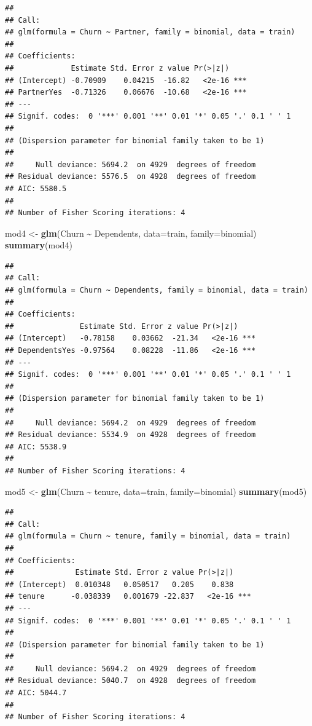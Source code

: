 \documentclass[
  twoside]{article}
\newenvironment{Shaded}{\begin{snugshade}}{\end{snugshade}}
\newcommand{\AttributeTok}[1]{\textcolor[rgb]{0.13,0.29,0.53}{#1}}
\newcommand{\FunctionTok}[1]{\textcolor[rgb]{0.13,0.29,0.53}{\textbf{#1}}}
\newcommand{\NormalTok}[1]{#1}
\newcommand{\OtherTok}[1]{\textcolor[rgb]{0.56,0.35,0.01}{#1}}
\newcommand{\SpecialCharTok}[1]{\textcolor[rgb]{0.81,0.36,0.00}{\textbf{#1}}}
\begin{document}
\begin{verbatim}
## 
## Call:
## glm(formula = Churn ~ Partner, family = binomial, data = train)
## 
## Coefficients:
##             Estimate Std. Error z value Pr(>|z|)    
## (Intercept) -0.70909    0.04215  -16.82   <2e-16 ***
## PartnerYes  -0.71326    0.06676  -10.68   <2e-16 ***
## ---
## Signif. codes:  0 '***' 0.001 '**' 0.01 '*' 0.05 '.' 0.1 ' ' 1
## 
## (Dispersion parameter for binomial family taken to be 1)
## 
##     Null deviance: 5694.2  on 4929  degrees of freedom
## Residual deviance: 5576.5  on 4928  degrees of freedom
## AIC: 5580.5
## 
## Number of Fisher Scoring iterations: 4
\end{verbatim}

\begin{Shaded}
\begin{Highlighting}[]
\NormalTok{mod4 }\OtherTok{\textless{}{-}} \FunctionTok{glm}\NormalTok{(Churn }\SpecialCharTok{\textasciitilde{}}\NormalTok{ Dependents, }\AttributeTok{data=}\NormalTok{train, }\AttributeTok{family=}\NormalTok{binomial)}
\FunctionTok{summary}\NormalTok{(mod4)}
\end{Highlighting}
\end{Shaded}

\begin{verbatim}
## 
## Call:
## glm(formula = Churn ~ Dependents, family = binomial, data = train)
## 
## Coefficients:
##               Estimate Std. Error z value Pr(>|z|)    
## (Intercept)   -0.78158    0.03662  -21.34   <2e-16 ***
## DependentsYes -0.97564    0.08228  -11.86   <2e-16 ***
## ---
## Signif. codes:  0 '***' 0.001 '**' 0.01 '*' 0.05 '.' 0.1 ' ' 1
## 
## (Dispersion parameter for binomial family taken to be 1)
## 
##     Null deviance: 5694.2  on 4929  degrees of freedom
## Residual deviance: 5534.9  on 4928  degrees of freedom
## AIC: 5538.9
## 
## Number of Fisher Scoring iterations: 4
\end{verbatim}

\begin{Shaded}
\begin{Highlighting}[]
\NormalTok{mod5 }\OtherTok{\textless{}{-}} \FunctionTok{glm}\NormalTok{(Churn }\SpecialCharTok{\textasciitilde{}}\NormalTok{ tenure, }\AttributeTok{data=}\NormalTok{train, }\AttributeTok{family=}\NormalTok{binomial)}
\FunctionTok{summary}\NormalTok{(mod5)}
\end{Highlighting}
\end{Shaded}

\begin{verbatim}
## 
## Call:
## glm(formula = Churn ~ tenure, family = binomial, data = train)
## 
## Coefficients:
##              Estimate Std. Error z value Pr(>|z|)    
## (Intercept)  0.010348   0.050517   0.205    0.838    
## tenure      -0.038339   0.001679 -22.837   <2e-16 ***
## ---
## Signif. codes:  0 '***' 0.001 '**' 0.01 '*' 0.05 '.' 0.1 ' ' 1
## 
## (Dispersion parameter for binomial family taken to be 1)
## 
##     Null deviance: 5694.2  on 4929  degrees of freedom
## Residual deviance: 5040.7  on 4928  degrees of freedom
## AIC: 5044.7
## 
## Number of Fisher Scoring iterations: 4
\end{verbatim}
\end{document}

